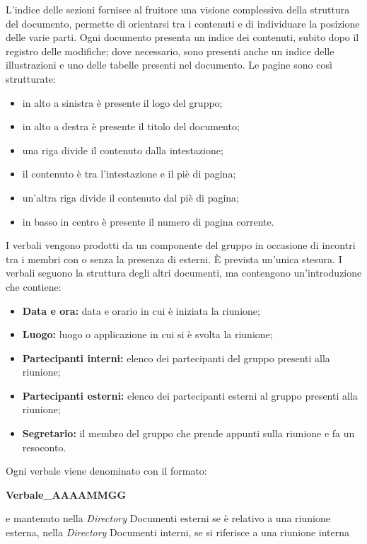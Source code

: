             L’indice delle sezioni fornisce al fruitore una visione complessiva della struttura del documento, permette di orientarsi tra i contenuti e di individuare la posizione delle varie parti. Ogni documento presenta un indice dei contenuti, subito dopo il registro delle modifiche; dove necessario, sono presenti anche un indice delle illustrazioni e uno delle tabelle presenti nel documento.
            Le pagine sono così strutturate:
            \begin{itemize}
                \item in alto a sinistra è presente il logo del gruppo;
                \item in alto a destra è presente il titolo del documento;
                \item una riga divide il contenuto dalla intestazione;
                \item il contenuto è tra l'intestazione e il piè di pagina;
                \item un'altra riga divide il contenuto dal piè di pagina;
                \item in basso in centro è presente il numero di pagina corrente.
            \end{itemize}
            I verbali vengono prodotti da un componente del gruppo in occasione di incontri tra i membri con o senza la presenza di esterni. È prevista un'unica stesura. I verbali seguono la struttura degli altri documenti, ma contengono un'introduzione che contiene:
            \begin{itemize}
                \item \textbf{Data e ora:} data e orario in cui è iniziata la riunione;
                \item \textbf{Luogo:} luogo o applicazione in cui si è svolta la riunione;
                \item \textbf{Partecipanti interni:} elenco dei partecipanti del gruppo presenti alla riunione;
                \item \textbf{Partecipanti esterni:} elenco dei partecipanti esterni al gruppo presenti alla riunione; 
                \item \textbf{Segretario:} il membro del gruppo che prende appunti sulla riunione e fa un resoconto.
            \end{itemize}
            Ogni verbale viene denominato con il formato:
            \begin{center}
                \textbf{Verbale\_AAAAMMGG} \\
            \end{center}
            e mantenuto nella \textit{Directory} Documenti esterni se è relativo a una riunione esterna, nella \textit{Directory} Documenti interni, se si riferisce a una riunione interna
